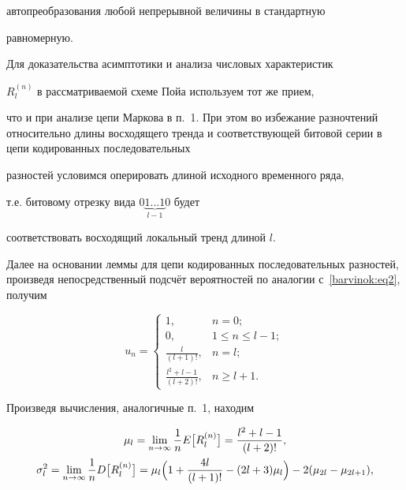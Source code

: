 автопреобразования любой непрерывной величины в стандартную

равномерную.



Для доказательства асимптотики и анализа числовых характеристик

$R_l^{(n)}$ в рассматриваемой схеме Пойа используем тот же прием,

что и при анализе цепи Маркова в п.~1. При этом во избежание разночтений относительно длины восходящего тренда и соответствующей битовой серии в цепи кодированных последовательных

разностей условимся оперировать длиной исходного временного ряда,

т.е. битовому отрезку вида $0\underbrace {1...1}_{l-1}0$ будет

соответствовать восходящий локальный тренд длиной $l$. 

Далее на основании леммы  для цепи кодированных последовательных  разностей, произведя непосредственный подсчёт вероятностей по аналогии с~\eqref{barvinok:eq2}, получим

$$

u_n=\begin{cases}

 1,& n=0; \\

 0,& 1\le n\le l-1; \\

\frac{l}{( l+1)!}, & n=l; \\

\frac{l^2+l-1}{(l+2)!},& n\ge l+1.

\end{cases}

$$

Произведя вычисления, аналогичные п.~1, находим

\begin{gather}

\label{barvinok:eq28}

 \mu _l = \lim \limits_{n\to \infty

} \frac{1}{n} E\bigl[ R_l^{(n)} \bigr]=\frac{l^2+l-1}{(l+2)!},\\

\label{barvinok:eq29} \sigma _l^2 =\lim \limits_{n\to \infty}

\frac{1}{n}D \bigl[ R_l^{(n)} \bigr]=\mu _l \Bigl( 1+\frac{4l}{(

l+1)!}-(2l+3)\mu _l \Bigr)-2 (\mu _{2l} -\mu _{2l+1}),

\end{gather}



